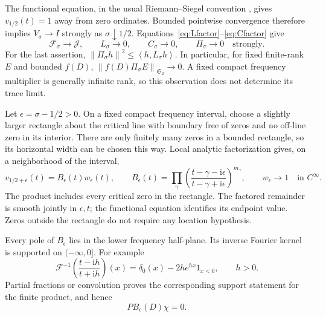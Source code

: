 \documentclass[11pt]{article}
\numberwithin{equation}{section}
\theoremstyle{definition}
\theoremstyle{remark}
\newcommand{\ii}{\mathrm i}
\newcommand{\Id}{I}
\newcommand{\J}{\mathcal J}
\newcommand{\Fcal}{\mathcal F}
\newcommand{\Stwo}{\mathfrak S_2}
\newcommand{\norm}[1]{\left\lVert #1\right\rVert}
\newcommand{\inner}[2]{\left\langle #1,#2\right\rangle}
\begin{document}
The functional equation, in the usual Riemann--Siegel convention
\cite{DLMF}, gives \(v_{1/2}(t)=1\) away from zero ordinates.
Bounded pointwise convergence therefore implies
\(V_\sigma\to\Id\) strongly as \(\sigma\downarrow1/2\).
Equations~\eqref{eq:Lfactor}--\eqref{eq:Cfactor} give
\begin{equation}\label{eq:strong}
\Fcal_\sigma\longrightarrow\J,\qquad
L_\sigma\longrightarrow0,\qquad
C_\sigma\longrightarrow0,\qquad
\Pi_\sigma\longrightarrow0
\quad\text{strongly}.
\end{equation}
For the last assertion,
\(\norm{\Pi_\sigma h}^2\le\inner h{L_\sigma h}\).
In particular, for fixed finite-rank \(E\) and bounded \(f(D)\),
\(\norm{f(D)\Pi_\sigma E}_{\Stwo}\to0\).
A fixed compact frequency multiplier is generally infinite rank,
so this observation does not determine its trace limit.

Let \(\epsilon=\sigma-1/2>0\). On a fixed compact frequency interval,
choose a slightly larger rectangle about the critical line with
boundary free of zeros and no off-line zero in its interior.
There are only finitely many zeros in a bounded rectangle, so its
horizontal width can be chosen this way. Local analytic factorization
gives, on a neighborhood of the interval,
\begin{equation}\label{eq:critical-factor}
v_{1/2+\epsilon}(t)=B_\epsilon(t)w_\epsilon(t),
\qquad
B_\epsilon(t)=\prod_\gamma
\left(\frac{t-\gamma-\ii\epsilon}
{t-\gamma+\ii\epsilon}\right)^{m_\gamma},
\qquad
w_\epsilon\longrightarrow1\quad\text{in }C^\infty.
\end{equation}
The product includes every critical zero in the rectangle. The factored
remainder is smooth jointly in \(\epsilon,t\); the functional equation
identifies its endpoint value. Zeros outside the rectangle do not
require any location hypothesis.

Every pole of \(B_\epsilon\) lies in the lower frequency half-plane.
Its inverse Fourier kernel is supported on \((-\infty,0]\).
For example
\begin{equation}\label{eq:onefactor-kernel}
\mathcal F^{-1}\left(\frac{t-\ii h}{t+\ii h}\right)(x)
=\delta_0(x)-2h e^{hx}1_{x<0},\qquad h>0.
\end{equation}
Partial fractions or convolution proves the corresponding support
statement for the finite product, and hence
\begin{equation}\label{eq:triangular-B}
P B_\epsilon(D)\chi=0.
\end{equation}
\end{document}
